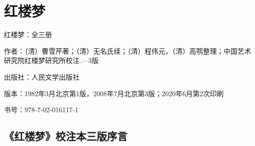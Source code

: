 

\section{红楼梦}


\par 红楼梦：全三册
\par 作者：（清）曹雪芹著；（清）无名氏续；（清）程伟元，（清）高鹗整理；中国艺术研究院红楼梦研究所校注.—3版
\par 出版社：人民文学出版社
\par 版本：1982年3月北京第1版，2008年7月北京第3版；2020年6月第2次印刷
\par 书号：978-7-02-016117-1

\subsection*{《红楼梦》校注本三版序言}


